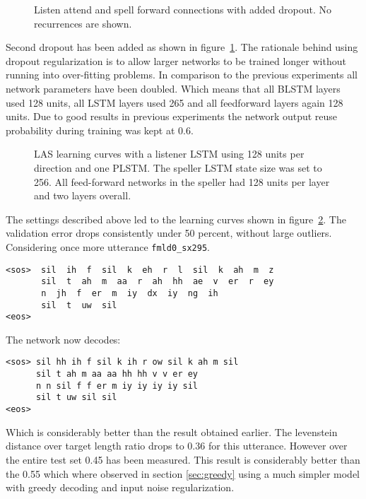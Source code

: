 \begin{figure}
\centering

\caption{Listen attend and spell forward connections with added dropout. No recurrences are shown.}
\label{fig:dropout}
\end{figure}
Second dropout has been added as shown in figure~\ref{fig:dropout}. The rationale behind using dropout regularization is to allow larger networks to be trained longer without running into over-fitting problems. In comparison to the previous experiments all network parameters have been doubled. Which means that all BLSTM layers used 128 units, all LSTM layers used 265 and all feedforward layers again 128 units. Due to good results in previous experiments the network output reuse probability during training was kept at 0.6. 
\begin{figure}


\caption{LAS learning curves with a listener LSTM using 128 units per direction and one PLSTM. The speller LSTM state size was set to 256. All feed-forward networks in the speller had 128 units per layer and two layers overall.}
\label{fig:dropBeamRes}
\end{figure}
The settings described above led to the learning curves shown in figure~\ref{fig:dropBeamRes}. The validation error drops consistently under 50 percent, without large outliers. Considering once more utterance \texttt{fmld0\_sx295}.
\begin{lstlisting}[caption={Targets}]
<sos>  sil  ih  f  sil  k  eh  r  l  sil  k  ah  m  z
       sil  t  ah  m  aa  r  ah  hh  ae  v  er  r  ey
       n  jh  f  er  m  iy  dx  iy  ng  ih  
       sil  t  uw  sil
<eos>
\end{lstlisting}
The network now decodes:
\begin{lstlisting}[caption={Network output}]
<sos> sil hh ih f sil k ih r ow sil k ah m sil 
	  sil t ah m aa aa hh hh v v er ey 
	  n n sil f f er m iy iy iy iy sil
	  sil t uw sil sil
<eos>
\end{lstlisting}
Which is considerably better than the result obtained earlier. The levenstein distance over target length ratio drops to 0.36 for this utterance. However over the entire test set 0.45 has been measured. This result is considerably better than the 0.55 which where observed in section \ref{sec:greedy} using a much simpler model with greedy decoding and input noise regularization.  




